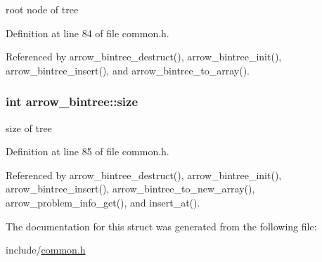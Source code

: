 root node of tree 

Definition at line 84 of file common.h.

Referenced by arrow\_\-bintree\_\-destruct(), arrow\_\-bintree\_\-init(), arrow\_\-bintree\_\-insert(), and arrow\_\-bintree\_\-to\_\-array().\hypertarget{structarrow__bintree_7570628df0b5317cc8e240499ba12974}{
\subsubsection[{size}]{\setlength{\rightskip}{0pt plus 5cm}int {\bf arrow\_\-bintree::size}}}
\label{structarrow__bintree_7570628df0b5317cc8e240499ba12974}


size of tree 

Definition at line 85 of file common.h.

Referenced by arrow\_\-bintree\_\-destruct(), arrow\_\-bintree\_\-init(), arrow\_\-bintree\_\-insert(), arrow\_\-bintree\_\-to\_\-new\_\-array(), arrow\_\-problem\_\-info\_\-get(), and insert\_\-at().

The documentation for this struct was generated from the following file:\begin{CompactItemize}
\item 
include/\hyperlink{common_8h}{common.h}\end{CompactItemize}

